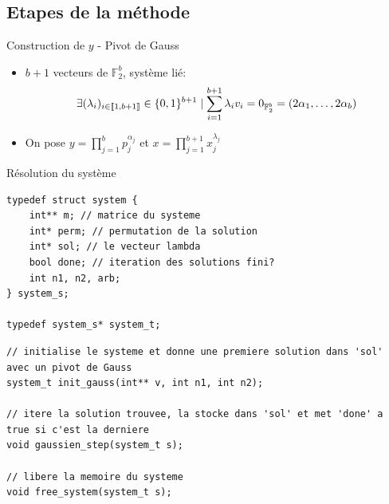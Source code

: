 \documentclass{beamer}
\begin{document}
\subsection{Etapes de la méthode}



\begin{frame}{Construction de $y$ - Pivot de Gauss}
    \begin{itemize}[<+->]
        \item $b+1$ vecteurs de $\mathbb F_2^b$, système lié:
        $$
        \exists (\lambda_i)_{i \in \llbracket 1,b+1 \rrbracket}\in \mathbb \{0,1\}^{b+1} \mid \sum_{i=1}^{b+1} \lambda_iv_i = 0_{\mathbb F_2^b} = (2\alpha_1, \dots, 2\alpha_b)
        $$
        \item On pose $y = \prod_{j=1}^b p_j^{\alpha_j}$ et $x = \prod_{j=1}^{b+1}x_j^{\lambda_j}$ 
    \end{itemize}
\end{frame}

\begin{frame}[fragile]{Résolution du système}
    \begin{lstlisting}[style=slideStyle]
typedef struct system {
    int** m; // matrice du systeme
    int* perm; // permutation de la solution 
    int* sol; // le vecteur lambda
    bool done; // iteration des solutions fini?
    int n1, n2, arb;
} system_s;

typedef system_s* system_t;
    \end{lstlisting}
\end{frame}

\begin{frame}[fragile]
    \begin{lstlisting}[style=slideStyle]
// initialise le systeme et donne une premiere solution dans 'sol' avec un pivot de Gauss
system_t init_gauss(int** v, int n1, int n2);

// itere la solution trouvee, la stocke dans 'sol' et met 'done' a true si c'est la derniere
void gaussien_step(system_t s);

// libere la memoire du systeme
void free_system(system_t s);
    \end{lstlisting}
\end{frame}
\end{document}
